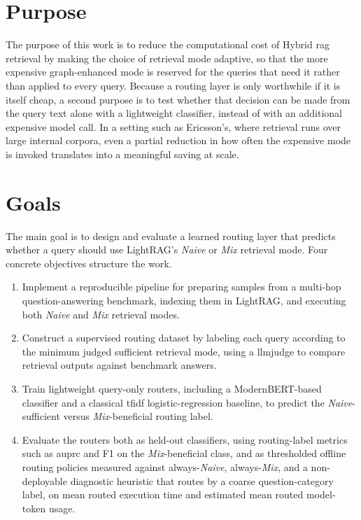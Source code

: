 \documentclass[english, bibtex]{kththesis}               %
\numberwithin{listing}{chapter}
\begin{document}
\section{Purpose}
\label{sec:purpose}
The purpose of this work is to reduce the computational cost of Hybrid \gls{rag} retrieval by making the choice of retrieval mode adaptive, so that the more expensive graph-enhanced mode is reserved for the queries that need it rather than applied to every query. Because a routing layer is only worthwhile if it is itself cheap, a second purpose is to test whether that decision can be made from the query text alone with a lightweight classifier, instead of with an additional expensive model call. In a setting such as Ericsson's, where retrieval runs over large internal corpora, even a partial reduction in how often the expensive mode is invoked translates into a meaningful saving at scale.



\section{Goals}
\label{sec:goals}
The main goal is to design and evaluate a learned routing layer that predicts whether a query should use LightRAG's \emph{Naive} or \emph{Mix} retrieval mode. Four concrete objectives structure the work.

\begin{enumerate}
\item Implement a reproducible pipeline for preparing samples from a multi-hop question-answering benchmark, indexing them in LightRAG, and executing both \emph{Naive} and \emph{Mix} retrieval modes.
\item Construct a supervised routing dataset by labeling each query according to the minimum judged sufficient retrieval mode, using a \gls{llmjudge} to compare retrieval outputs against benchmark answers.
\item Train lightweight query-only routers, including a ModernBERT-based classifier and a classical \gls{tfidf} logistic-regression baseline, to predict the \emph{Naive}-sufficient versus \emph{Mix}-beneficial routing label.
\item Evaluate the routers both as held-out classifiers, using routing-label metrics such as \gls{auprc} and F1 on the \emph{Mix}-beneficial class, and as thresholded offline routing policies measured against always-\emph{Naive}, always-\emph{Mix}, and a non-deployable diagnostic heuristic that routes by a coarse question-category label, on mean routed execution time and estimated mean routed model-token usage.
\end{enumerate}
\end{document}

